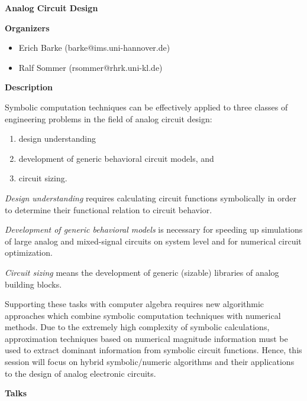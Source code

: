 \begin{center}
{\LARGE \bf Analog Circuit Design}
\end{center}
\bigskip

\noindent
{\bf Organizers}

\begin{itemize}

\item 
Erich Barke (barke@ims.uni-hannover.de)
\item
Ralf Sommer (rsommer@rhrk.uni-kl.de)
\end{itemize}

\medskip

\bigskip

\noindent
{\bf Description}

\medskip
Symbolic computation techniques can be effectively applied to three classes of engineering
problems in the field of analog circuit design: 

\begin{enumerate}
\item
design understanding
\item
development of generic behavioral circuit models, and 

\item
circuit sizing.
\end{enumerate}

{\em Design understanding} requires calculating circuit functions symbolically in order to determine
their functional relation to circuit behavior. 

{\em Development of generic behavioral models} is necessary for speeding up simulations of large analog
and mixed-signal circuits on system level and for numerical circuit optimization. 

{\em Circuit sizing} means the development of generic (sizable) libraries of analog building blocks. 

Supporting these tasks with computer algebra requires new algorithmic approaches which combine
symbolic computation techniques with numerical methods. Due to the extremely high complexity
of symbolic calculations, approximation techniques based on numerical magnitude information
must be used to extract dominant information from symbolic circuit functions. Hence, this session
will focus on hybrid symbolic/numeric algorithms and their applications to the design of analog
electronic circuits. 


\bigskip
\noindent
{\bf Talks}
\medskip

